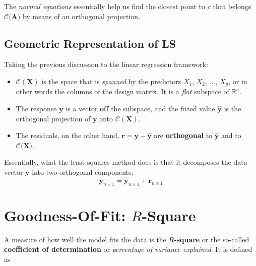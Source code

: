 \documentclass[
]{book}
\begin{document}
The \emph{normal equations} essentially help us find the closest point to \(c\) that belongs \(\mathcal{C}\bigl(\mathbf{A}\Bigr)\) by means of an orthogonal projection.

\subsection*{Geometric Representation of LS}\label{geometric-representation-of-ls}

Taking the previous discussion to the linear regression framework:

\begin{itemize}
\item
  \(\mathcal{C}(\mathbf{X})\) is the space that is \emph{spanned} by the predictors \(X_1\), \(X_2\), \(\ldots\), \(X_p\), or in other words the columns of the design matrix. It is a \emph{flat} subspace of \(\mathbb{R}^n\).
\item
  The response \(\mathbf{y}\) is a vector \textbf{off} the subspace, and the fitted value \(\hat{\mathbf{y}}\) is the orthogonal projection of \(\mathbf{y}\) onto \(\mathcal{C}(\mathbf{X})\).
\item
  The residuals, on the other hand, \(\mathbf{r} = \mathbf{y} - \hat{\mathbf{y}}\) are \textbf{orthogonal} to \(\hat{\mathbf{y}}\) and to \(\mathcal{C}\bigl( \mathbf{X} \bigr)\).
\end{itemize}

Essentially, what the least-squares method does is that it decomposes the data vector \(\mathbf{y}\) into two orthogonal components:
\[\mathbf{y}_{n\times 1} = \hat{\mathbf{y}}_{n\times 1} + \mathbf{r}_{n\times 1}\]

\section{\texorpdfstring{Goodness-Of-Fit: \(R\)-Square}{Goodness-Of-Fit: R-Square}}\label{goodness-of-fit-r-square}

A measure of how well the model fits the data is the \textbf{\(R\)-square} or the so-called \textbf{coefficient of determination} or \emph{percentage of variance explained}. It is defined as
\end{document}
